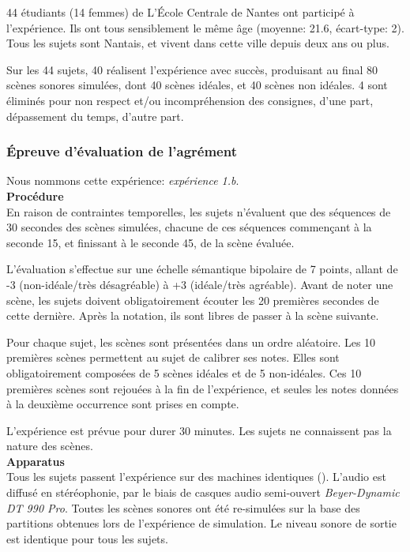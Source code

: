 44 étudiants (14 femmes) de L’École Centrale de Nantes ont participé à l'expérience. Ils ont tous sensiblement le même âge (moyenne: 21.6, écart-type: 2). Tous les sujets sont Nantais, et vivent dans cette ville depuis deux ans ou plus.

Sur les 44 sujets, 40 réalisent l'expérience avec succès, produisant au final 80 scènes sonores simulées, dont 40 scènes idéales, et 40 scènes non idéales. 4 sont éliminés pour non respect et/ou incompréhension des consignes, d'une part, dépassement du temps, d'autre part.

\subsubsection{Épreuve d'évaluation de l'agrément}
\label{sec:ch5_planExpEvaA}

Nous nommons cette expérience: \emph{expérience 1.b}. \\

\textbf{Procédure} \\

En raison de contraintes temporelles, les sujets n'évaluent que des séquences de 30 secondes des scènes simulées, chacune de ces séquences commençant à la seconde 15, et finissant à le seconde 45, de la scène évaluée.

L'évaluation s'effectue sur une échelle sémantique bipolaire de 7 points, allant de -3 (non-idéale/très désagréable) à +3 (idéale/très agréable). Avant de noter une scène, les sujets doivent obligatoirement écouter les 20 premières secondes de cette dernière. Après la notation, ils sont libres de passer à la scène suivante.

Pour chaque sujet, les scènes sont présentées dans un ordre aléatoire. Les 10 premières scènes permettent au sujet de calibrer ses notes. Elles sont obligatoirement composées de 5 scènes idéales et de 5 non-idéales. Ces 10 premières scènes sont rejouées à la fin de l'expérience, et seules les notes données à la deuxième occurrence sont prises en compte. 

L'expérience est prévue pour durer 30 minutes. Les sujets ne connaissent pas la nature des scènes.\\

\textbf{Apparatus} \\

Tous les sujets passent l'expérience sur des machines identiques (). L'audio est diffusé en stéréophonie, par le biais de casques audio semi-ouvert \emph{Beyer-Dynamic DT 990 Pro}. Toutes les scènes sonores ont été re-simulées sur la base des partitions obtenues lors de l'expérience de simulation. Le niveau sonore de sortie est identique pour tous les sujets.

